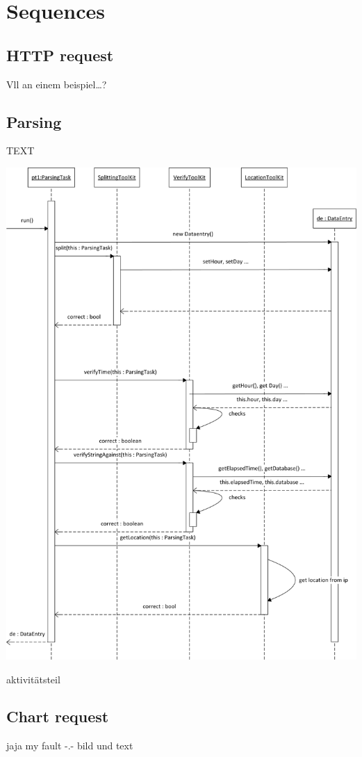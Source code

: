 \section{Sequences}

\subsection{HTTP request}
Vll an einem beispiel\ldots ?

\subsection{Parsing}
TEXT
\begin{center}
\includegraphics[width=0.7\linewidth]{Pictures/Seq/SeqParser.png}
\end{center}

aktivitätsteil

\subsection{Chart request}
jaja my fault -.-
bild und text   
